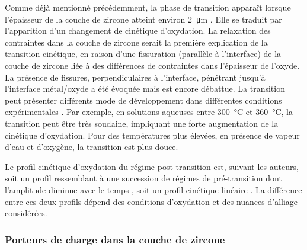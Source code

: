 \begin{refsection}
    
    Comme déjà mentionné précédemment, la phase de transition apparaît lorsque l'épaisseur de la couche de zircone atteint
    environ \SI{2}{\micro\meter} \citep{IAEA1998}. Elle se traduit par l'apparition d'un changement de cinétique
    d'oxydation. La relaxation des contraintes dans la couche de zircone serait la première explication de la transition
    cinétique, en raison d'une
    fissuration (parallèle à l'interface) de la couche de zircone liée à des différences de contraintes dans l'épaisseur de l'oxyde.
    La présence de fissures, perpendiculaires à l'interface, pénétrant jusqu'à l'interface métal/oxyde a été évoquée
    mais est encore débattue.
    La transition peut présenter différents mode de développement dans différentes conditions expérimentales
    \citep{Cox1968-1}. 
    Par exemple, en solutions aqueuses entre \SI{300}{\degreeCelsius} et \SI{360}{\degreeCelsius}, la transition peut être très
    soudaine, impliquant une forte augmentation de la cinétique d'oxydation. Pour des températures plus élevées, en présence
    de vapeur d'eau et d'oxygène, la transition est plus douce.
    
    Le profil cinétique d'oxydation du régime post-transition est, suivant les auteurs, soit un profil
    ressemblant à une succession de régimes de pré-transition dont l’amplitude diminue avec le temps
    \citep{Garcia1999}, soit un profil cinétique linéaire \citep{Vermoyal2002}. La différence entre ces deux profils dépend des
    conditions d’oxydation et des nuances d’alliage considérées.

    

    \subsubsection{Porteurs de charge dans la couche de zircone}\label{subsubsec:charge_carrier}


\end{refsection}
